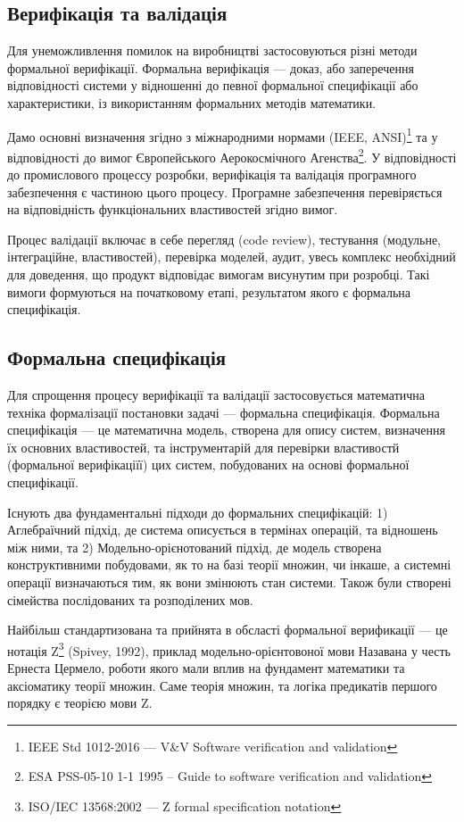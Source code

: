 \documentclass{article}
\begin{document}
\subsection{Верифікація та валідація}

Для унеможливлення помилок на виробництві застосовуються різні
методи формальної верифікації. Формальна верифікація — доказ, або заперечення
відповідності системи у відношенні до певної формальної специфікації або характеристики,
із використанням формальних методів математики.

Дамо основні визначення згідно з міжнародними нормами (IEEE, ANSI)\footnote{IEEE Std 1012-2016  --- V\&V Software verification and validation} та у відповідності до вимог
Європейського Аерокосмічного Агенства\footnote{ESA PSS-05-10 1-1 1995 -- Guide to software verification and validation}.
У відповідності до промислового процессу розробки, верифікація та валідація програмного
забезпечення є частиною цього процесу. Програмне забезпечення перевіряється на
відповідність функціональних властивостей згідно вимог.

Процес валідації включає в себе перегляд (code review),
тестування (модульне, інтеграційне, властивостей), перевірка моделей, аудит,
увесь комплекс необхідний для доведення, що продукт відповідає вимогам
висунутим при розробці. Такі вимоги формуються на початковому етапі,
результатом якого є формальна специфікація.

\subsection{Формальна специфікація}

Для спрощення процесу верифікації та валідації
застосовується математична техніка формалізації постановки задачі --- формальна специфікація.
Формальна специфікація --- це математична модель, створена для опису систем,
визначення їх основних властивостей, та інструментарій для перевірки
властивостй (формальної верифікаціїї) цих систем, побудованих на основі формальної специфікації.

Існують два фундаментальні підходи до формальних специфікацій: 1) Аглебраїчний підхід, де
система описується в термінах операцій, та відношень між ними, та
2) Модельно-орієнотований підхід, де модель створена конструктивними побудовами,
як то на базі теорії множин, чи інкаше, а системні операції визначаються тим, як вони змінюють
стан системи. Також були створені сімейства послідованих та розподілених мов.

Найбільш стандартизована та прийнята в обсласті формальної верификації --- це нотація
Z\footnote{ISO/IEC 13568:2002 --- Z formal specification notation} (Spivey, 1992), приклад
модельно-орієнтовоної мови
Назавана у честь Ернеста Цермело, роботи якого мали вплив на фундамент математики та аксіоматику
теорії множин. Саме теорія множин, та логіка предикатів першого порядку є теорією мови Z.
\end{document}
